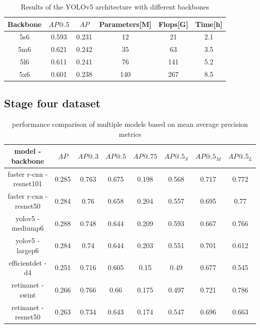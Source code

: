 \begin{table}
    \begin{tabular}{c|c|c|c|c|c}
        Backbone & $AP@.5$ & $AP$  & Parameters[M] & Flops[G] & Time[h] \\ \hline
        5s6      & 0.593   & 0.231 & 12            & 21       & 2.1     \\ \hline
        5m6      & 0.621   & 0.242 & 35            & 63       & 3.5     \\ \hline
        5l6      & 0.611   & 0.241 & 76            & 141      & 5.2     \\ \hline
        5x6      & 0.601   & 0.238 & 140           & 267      & 8.5     \\
    \end{tabular}
    \caption{Results of the YOLOv5 architecture with different backbones}
    \label{tab:yolov5_backbones}
\end{table}

\subsection{Stage four dataset}

\begin{table}
    \begin{tabular}{c||c|c|c|c|c|c|c}
        model - backbone         & $AP$  & $AP@.3$ & $AP@.5$ & $AP@.75$ & $AP@.5_S$ & $AP@.5_M$ & $AP@.5_L$ \\ \hline \hline
        faster r-cnn - resnet101 & 0.285 & 0.763   & 0.675   & 0.198    & 0.568     & 0.717     & 0.772     \\ \hline
        faster r-cnn - resnet50  & 0.284 & 0.76    & 0.658   & 0.204    & 0.557     & 0.695     & 0.77      \\ \hline
        yolov5 - mediump6        & 0.288 & 0.748   & 0.644   & 0.209    & 0.593     & 0.667     & 0.766     \\ \hline
        yolov5 - largep6         & 0.284 & 0.74    & 0.644   & 0.203    & 0.551     & 0.701     & 0.612     \\ \hline
        efficientdet - d4        & 0.251 & 0.716   & 0.605   & 0.15     & 0.49      & 0.677     & 0.545     \\ \hline
        retinanet - swint        & 0.266 & 0.766   & 0.66    & 0.175    & 0.497     & 0.721     & 0.786     \\ \hline
        retinanet - resnet50     & 0.263 & 0.734   & 0.643   & 0.174    & 0.547     & 0.696     & 0.663     \\
    \end{tabular}
    \caption{performance comparison of multiple models based on mean average precision metrics}
    \label{tab:model_results:stage_four}
\end{table}

